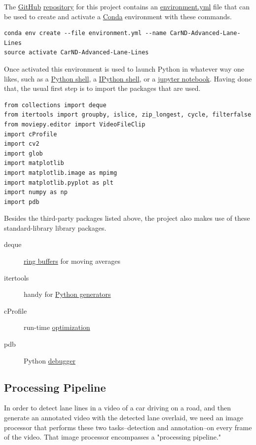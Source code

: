\documentclass[11pt]{article}
\begin{document}
The \href{https://github.com/}{GitHub} \href{https://github.com/dventimi/CarND-Advanced-Lane-Lines}{repository} for this project contains an \href{environment.yml}{environment.yml}
file that can be used to create and activate a \href{https://conda.io/docs/}{Conda} environment
with these commands.

\begin{verbatim}
conda env create --file environment.yml --name CarND-Advanced-Lane-Lines
source activate CarND-Advanced-Lane-Lines
\end{verbatim}

Once activated this environment is used to launch Python in
whatever way one likes, such as a \href{https://www.python.org/shell/}{Python shell}, a \href{https://ipython.org/}{IPython shell},
or a \href{http://jupyter.org/}{jupyter notebook}.  Having done that, the usual first step is
to import the packages that are used.  

\begin{verbatim}
from collections import deque
from itertools import groupby, islice, zip_longest, cycle, filterfalse
from moviepy.editor import VideoFileClip
import cProfile
import cv2
import glob
import matplotlib
import matplotlib.image as mpimg
import matplotlib.pyplot as plt
import numpy as np
import pdb
\end{verbatim}

Besides the third-party packages listed above, the project also
makes use of these standard-library library packages.

\begin{description}
\item[{deque}] \href{https://en.wikipedia.org/wiki/Circular_buffer}{ring buffers} for moving averages
\item[{itertools}] handy for \href{http://davidaventimiglia.com/python_generators.html}{Python generators}
\item[{cProfile}] run-time \href{https://docs.python.org/2/library/profile.html}{optimization}
\item[{pdb}] Python \href{https://docs.python.org/3/library/pdb.html}{debugger}
\end{description}


\subsection*{Processing Pipeline}
\label{sec-2-2}

In order to detect lane lines in a video of a car driving on a
road, and then generate an annotated video with the detected lane
overlaid, we need an image processor that performs these two
tasks--detection and annotation--on every frame of the video.
That image processor encompasses a "processing pipeline."  
\end{document}
